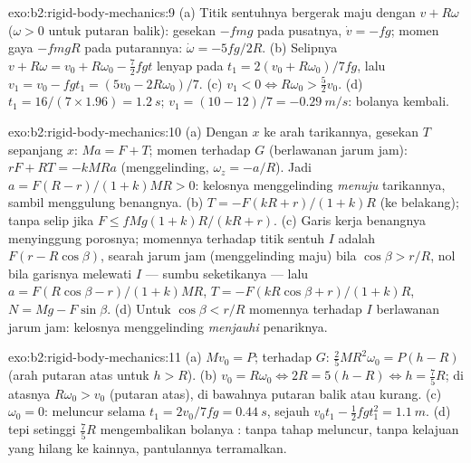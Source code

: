 \begin{solution}{exo:b2:rigid-body-mechanics:9}
(a) Titik sentuhnya bergerak maju dengan $v + R\omega$ ($\omega > 0$ untuk
putaran balik): gesekan $-fmg$ pada pusatnya, $\dot v = -fg$; momen gaya
$-fmgR$ pada putarannya: $\dot\omega = -5fg/2R$. (b) Selipnya $v + R\omega = v_0 +
R\omega_0 - \tfrac72fgt$ lenyap pada $t_1 = 2(v_0 + R\omega_0)/7fg$, lalu $v_1
= v_0 - fgt_1 = (5v_0 - 2R\omega_0)/7$. (c) $v_1 < 0 \iff R\omega_0 > \tfrac52v_0$.
(d) $t_1 = 16/(7 \times 1.96) = \qty{1.2}{s}$; $v_1 = (10 - 12)/7 = \qty{-0.29}{m/s}$:
bolanya kembali.
\end{solution}

\begin{solution}{exo:b2:rigid-body-mechanics:10}
(a) Dengan $x$ ke arah tarikannya, gesekan $T$ sepanjang $x$: $Ma = F + T$;
momen terhadap $G$ (berlawanan jarum jam): $rF + RT = -kMRa$ (menggelinding, $\omega_z
= -a/R$). Jadi $a = F(R - r)/(1 + k)MR > 0$: kelosnya menggelinding
\emph{menuju} tarikannya, sambil menggulung benangnya. (b) $T = -F(kR + r)/(1 +
k)R$ (ke belakang); tanpa selip jika $F \le fMg(1 + k)R/(kR + r)$. (c) Garis
kerja benangnya menyinggung porosnya; momennya terhadap titik sentuh
$I$ adalah $F(r - R\cos\beta)$, searah jarum jam (menggelinding maju) bila $\cos\beta >
r/R$, nol bila garisnya melewati $I$ --- sumbu seketikanya --- lalu
$a = F(R\cos\beta - r)/(1 + k)MR$, $T = -F(kR\cos\beta + r)/(1 + k)R$,
$N = Mg - F\sin\beta$. (d) Untuk $\cos\beta < r/R$ momennya terhadap $I$
berlawanan jarum jam: kelosnya menggelinding \emph{menjauhi} penariknya.
\end{solution}

\begin{solution}{exo:b2:rigid-body-mechanics:11}
(a) $Mv_0 = P$; terhadap $G$: $\tfrac25MR^2\omega_0 = P(h - R)$ (arah putaran atas
untuk $h > R$). (b) $v_0 = R\omega_0 \iff 2R = 5(h - R) \iff h = \tfrac75R$; di atasnya
$R\omega_0 > v_0$ (putaran atas), di bawahnya putaran balik atau kurang. (c)
$\omega_0 = 0$: meluncur selama $t_1 = 2v_0/7fg = \qty{0.44}{s}$, sejauh $v_0t_1 -
\tfrac12fgt_1^2 = \qty{1.1}{m}$. (d)  tepi setinggi $\tfrac75R$
mengembalikan bolanya : tanpa tahap
meluncur, tanpa kelajuan yang hilang ke kainnya, pantulannya terramalkan.
\end{solution}


